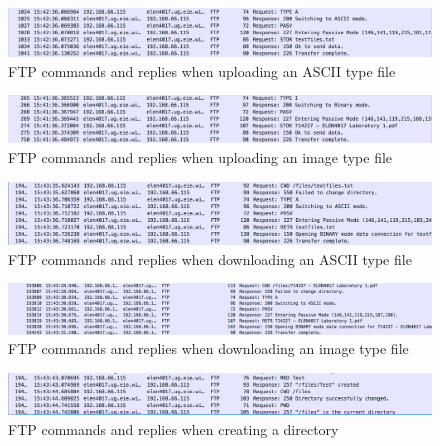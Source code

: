 \documentclass[10pt,twocolumn]{witseiepaper}
\begin{document}
\begin{appendix}
\begin{figure}[h]
	\centering
	\includegraphics[width=1\textwidth]{textUploadWits.png}
	\caption{FTP commands and replies when uploading an ASCII type file}
	\raggedright
	\label{fig:textUploadWits}	
\end{figure}

\begin{figure}[h]
	\centering
	\includegraphics[width=1\textwidth]{binaryUploadWits.png}
	\caption{FTP commands and replies when uploading an image type file}
	\raggedright
	\label{fig:binaryUploadWits}	
\end{figure}

\begin{figure}[h]
	\centering
	\includegraphics[width=1\textwidth]{downloadTextWits.png}
	\caption{FTP commands and replies when downloading an ASCII type file}
	\raggedright
	\label{fig:textDownloadWits}	
\end{figure}

\begin{figure}[h]
	\centering
	\includegraphics[width=1\textwidth]{downloadImageWits.png}
	\caption{FTP commands and replies when downloading an image type file}
	\raggedright
	\label{fig:binaryDownloadWits}	
\end{figure}

\begin{figure}[h]
	\centering
	\includegraphics[width=1\textwidth]{makeDirectoryWits.png}
	\caption{FTP commands and replies when creating a directory}
	\raggedright
	\label{fig:makeDirectoryWits}	
\end{figure}


\end{appendix}
\end{document}
